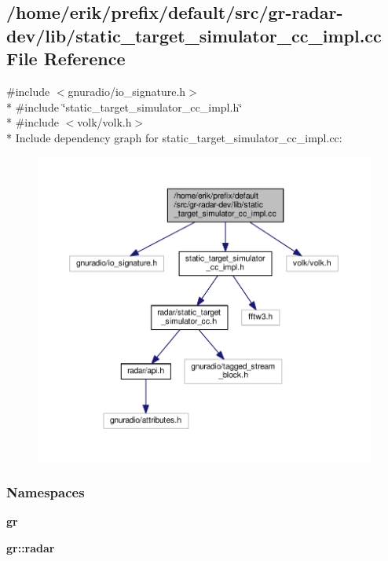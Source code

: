 \subsection{/home/erik/prefix/default/src/gr-\/radar-\/dev/lib/static\+\_\+target\+\_\+simulator\+\_\+cc\+\_\+impl.cc File Reference}
\label{static__target__simulator__cc__impl_8cc}
{\ttfamily \#include $<$gnuradio/io\+\_\+signature.\+h$>$}\\*
{\ttfamily \#include \char`\"{}static\+\_\+target\+\_\+simulator\+\_\+cc\+\_\+impl.\+h\char`\"{}}\\*
{\ttfamily \#include $<$volk/volk.\+h$>$}\\*
Include dependency graph for static\+\_\+target\+\_\+simulator\+\_\+cc\+\_\+impl.\+cc\+:
\nopagebreak
\begin{figure}[H]
\begin{center}
\leavevmode
\includegraphics[width=350pt]{d6/dd6/static__target__simulator__cc__impl_8cc__incl}
\end{center}
\end{figure}
\subsubsection*{Namespaces}
\begin{DoxyCompactItemize}
\item 
 {\bf gr}
\item 
 {\bf gr\+::radar}
\end{DoxyCompactItemize}
